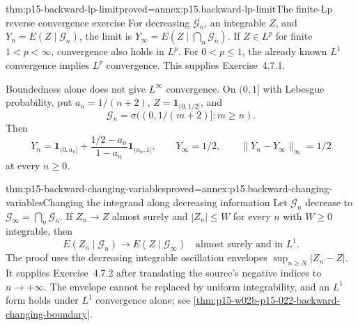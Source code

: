 \begin{hbtheorem}{thm:p15-backward-lp-limit}{proved=annex:p15.backward-lp-limit}{The finite-Lp reverse convergence exercise}
For decreasing \(\mathcal G_n\), an integrable \(Z\), and
\(Y_n=E(Z\mid\mathcal G_n)\), the limit is
\(Y_\infty=E(Z\mid\bigcap_n\mathcal G_n)\).
If \(Z\in L^p\) for finite \(1<p<\infty\), convergence also holds
in \(L^p\). For \(0<p\leq1\), the already known \(L^1\) convergence
implies \(L^p\) convergence. This supplies Exercise~4.7.1.

Boundedness alone does not give \(L^\infty\) convergence.
On \((0,1]\) with Lebesgue probability, put
\(a_n=1/(n+2)\), \(Z=\mathbf1_{(0,1/2]}\), and
\[
 \mathcal G_n=\sigma((0,1/(m+2)]:m\geq n).
\]
Then
\[
 Y_n=\mathbf1_{(0,a_n]}
       +\frac{1/2-a_n}{1-a_n}\mathbf1_{(a_n,1]},
 \qquad Y_\infty=1/2,
 \qquad \|Y_n-Y_\infty\|_\infty=1/2
\]
at every \(n\geq0\).
\end{hbtheorem}

\begin{hbtheorem}{thm:p15-backward-changing-variables}{proved=annex:p15.backward-changing-variables}{Changing the integrand along decreasing information}
Let \(\mathcal G_n\) decrease to \(\mathcal G_\infty=\bigcap_n\mathcal G_n\).
If \(Z_n\to Z\) almost surely and \(|Z_n|\leq W\) for every \(n\)
with \(W\geq0\) integrable, then
\[
                   E(Z_n\mid\mathcal G_n)
                      \longrightarrow E(Z\mid\mathcal G_\infty)
                         \quad\text{almost surely and in }L^1.
\]
The proof uses the decreasing integrable oscillation envelopes
\(\sup_{n\geq N}|Z_n-Z|\).
It supplies Exercise~4.7.2 after translating the source's
negative indices to \(n\to+\infty\).
The envelope cannot be replaced by uniform integrability, and an
\(L^1\) form holds under \(L^1\) convergence alone; see
\cref{thm:p15-w02b-p15-022-backward-changing-boundary}.
\end{hbtheorem}

